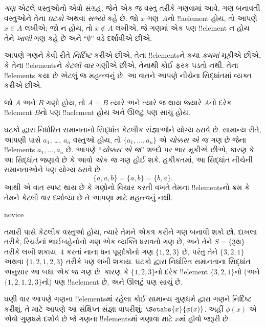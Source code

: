 \documentclass[../../../include/open-logic-section]{subfiles}
\begin{document}

\emph{ગણ} એટલે વસ્તુઓનો એવો સંગ્રહ, જેને {એક જ} વસ્તુ તરીકે ગણવામાં આવે.
ગણ બનાવતી વસ્તુઓને તેના \emph{ઘટકો} અથવા \emph{સભ્યો} કહે છે.
જો $x$ ગણ~$A$નો !!a{element} હોય, તો આપણે $x \in A$ લખીએ;
જો ન હોય, તો $x \notin A$ લખીએ. જે ગણમાં એક પણ !!{element} ન હોય
તેને \emph{ખાલી} ગણ કહે છે અને “$\emptyset$” વડે દર્શાવીએ છીએ.

\begin{explain}
આપણે ગણને કેવી રીતે \emph{નિર્દિષ્ટ} કરીએ છીએ, તેના !!{element}sને
કયા \emph{ક્રમમાં} મૂકીએ છીએ, કે તેના !!{element}sને \emph{કેટલી વાર}
ગણીએ છીએ, તેનાથી કોઈ ફરક પડતો નથી. તેના !!{element}s કયા છે એટલું જ
મહત્ત્વનું છે. આ વાતને આપણે નીચેના સિદ્ધાંતમાં વ્યક્ત કરીએ છીએ.
\end{explain}

\begin{defn}[ઘટકો દ્વારા નિર્ધારિત સમાનતા]
જો $A$ અને $B$ ગણો હોય, તો $A = B$ ત્યારે અને ત્યારે જ થાય જ્યારે
$A$નો દરેક !!{element} $B$નો પણ !!a{element} હોય અને ઊલટું પણ સાચું હોય.
\end{defn}

ઘટકો દ્વારા નિર્ધારિત સમાનતાનો સિદ્ધાંત કેટલીક સંજ્ઞાઓને યોગ્ય ઠરાવે છે.
સામાન્ય રીતે, આપણી પાસે $a_{1}$, \dots, $a_{n}$ વસ્તુઓ હોય, તો
$\{a_{1}, \dots, a_{n}\}$ એ \emph{ચોક્કસ એ જ} ગણ છે જેના !!{element}s
$a_1, \ldots, a_n$ છે. આપણે “\emph{ચોક્કસ એ જ}” શબ્દો પર ભાર મૂકીએ છીએ,
કારણ કે આ સિદ્ધાંત જણાવે છે કે આવો \emph{એક જ} ગણ હોઈ શકે.
હકીકતમાં, આ સિદ્ધાંત નીચેની સમાનતાઓને પણ યોગ્ય ઠરાવે છે:
  \[
    \{a, a, b\} = \{a, b\} = \{b,a\}.
  \]
આથી એ વાત સ્પષ્ટ થાય છે કે ગણોનો વિચાર કરતી વખતે તેમના !!{element}sનો
ક્રમ કે તેમને કેટલી વાર દર્શાવ્યા છે તે આપણા માટે મહત્ત્વનું નથી.

\begin{tagblock}{novice}
\begin{ex}
તમારી પાસે કેટલીક વસ્તુઓ હોય, ત્યારે તેમને એકત્ર કરીને ગણ બનાવી શકો છો.
દાખલા તરીકે, રિચર્ડનાં ભાઈબહેનોનો ગણ એક વ્યક્તિ ધરાવતો ગણ છે, અને તેને
$S=\{\textrm{રૂથ}\}$ તરીકે લખી શકાય.
$4$ કરતાં નાના ધન પૂર્ણાંકોનો ગણ $\{1, 2, 3\}$ છે, પરંતુ તેને
$\{3, 2, 1\}$ અથવા $\{1, 2, 1, 2, 3\}$ તરીકે પણ લખી શકાય.
ઘટકો દ્વારા નિર્ધારિત સમાનતાના સિદ્ધાંત અનુસાર આ બધા એક જ ગણ છે.
કારણ કે $\{1, 2, 3\}$નો દરેક !!{element} $\{3, 2, 1\}$નો
(અને $\{1, 2, 1, 2, 3\}$નો) પણ !!a{element} છે, અને ઊલટું પણ સાચું છે.
\end{ex}
\end{tagblock}

ઘણી વાર આપણે ગણના !!{element}sમાં રહેલા કોઈ સામાન્ય ગુણધર્મ દ્વારા
ગણને નિર્દિષ્ટ કરીશું. તે માટે આપણે આ સંક્ષિપ્ત સંજ્ઞા વાપરીશું:
$\Setabs{x}{\phi(x)}$. અહીં $\phi(x)$ એ એવો ગુણધર્મ દર્શાવે છે જે
ગણના !!{element}sમાં ગણાવા માટે $x$માં હોવો જરૂરી છે.
\end{document}
